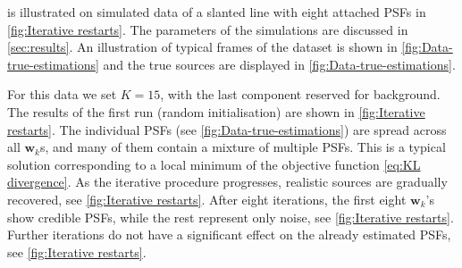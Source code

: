 \inmf{} is illustrated on simulated data of a slanted line with eight attached PSFs in \autoref{fig:Iterative restarts}. The parameters of the simulations are discussed in  \autoref{sec:results}. An illustration of typical frames of the dataset is shown in \autoref{fig:Data-true-estimations}\aaa{} and the true sources are displayed in \autoref{fig:Data-true-estimations}\bbb.

For this data we set $K=15$, with the last component reserved for background. The results of the first run (random initialisation) are shown in \autoref{fig:Iterative restarts}\aaa. The individual PSFs (see \autoref{fig:Data-true-estimations}\bbb) are spread across all $\bm{w}_k$s, and many of them contain a mixture of multiple PSFs. This is a typical solution corresponding to a local minimum of the objective function \autoref{eq:KL divergence}. As the iterative procedure progresses, realistic sources are gradually recovered, see \autoref{fig:Iterative restarts}\bbb. After eight iterations, the first eight $\bm{w}_k$'s show credible PSFs, while the rest represent only noise, see \autoref{fig:Iterative restarts}\ccc. Further iterations do not have a significant effect on the already estimated PSFs, see \autoref{fig:Iterative restarts}\ddd. 

